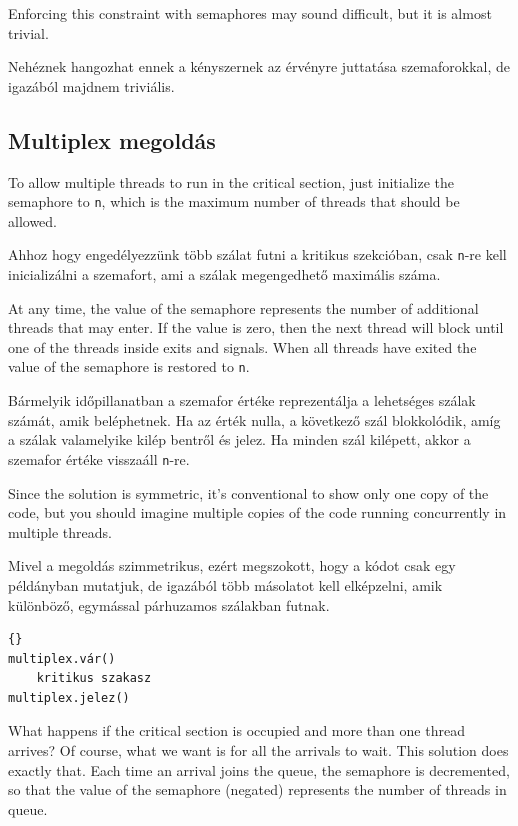 \documentclass{book}
\newcommand{\clearemptydoublepage}{\newpage\cleardoublepage}
\begin{document}
Enforcing this constraint with semaphores may sound difficult, but it
is almost trivial.

Nehéznek hangozhat ennek a kényszernek az érvényre juttatása szemaforokkal,
de igazából majdnem triviális.



\clearemptydoublepage
\subsection{Multiplex megoldás}

To allow multiple threads to run in the critical section, just
initialize the semaphore to {\tt n}, which is the maximum number
of threads that should be allowed.

Ahhoz hogy engedélyezzünk több szálat futni a kritikus szekcióban,
csak {\tt n}-re kell inicializálni a szemafort, ami a szálak megengedhető
maximális száma.

At any time, the value of the semaphore represents the
number of additional threads that may enter.  If the value is zero,
then the next thread will block until one of the threads inside
exits and signals.  When all threads have exited the value of the
semaphore is restored to {\tt n}.

Bármelyik időpillanatban a szemafor értéke reprezentálja a lehetséges
szálak számát, amik beléphetnek. Ha az érték nulla, a következő szál
blokkolódik, amíg a szálak valamelyike kilép bentről és jelez.
Ha minden szál kilépett, akkor a szemafor értéke visszaáll {\tt n}-re.

Since the solution is symmetric, it's conventional to show only one
copy of the code, but you should imagine multiple copies of the code
running concurrently in multiple threads.

Mivel a megoldás szimmetrikus, ezért megszokott, hogy a kódot csak
egy példányban mutatjuk, de igazából több másolatot kell elképzelni,
amik különböző, egymással párhuzamos szálakban futnak.

\begin{lstlisting}[title={Multiplex megoldás}]{}
multiplex.vár()
    kritikus szakasz 
multiplex.jelez()      
\end{lstlisting}

What happens if the critical section is occupied and more than one
thread arrives?  Of course, what we want is for all the arrivals to
wait.  This solution does exactly that.  Each time an arrival joins
the queue, the semaphore is decremented, so that the value of the
semaphore (negated) represents the number of threads in queue.
\end{document}
